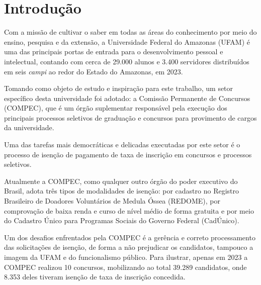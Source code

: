 \documentclass[
	12pt,			%
	openright,		%
	oneside,	
	a4paper,		%
	english,		%
	brazil			%
]{abntex2/abntex2}  %
\begin{document}



	\tableofcontents*
	\cleardoublepage

	\textual

	\chapter{Introdução}
	
		Com a missão de cultivar o saber em todas as áreas do conhecimento por meio do ensino, pesquisa e da extensão, a Universidade Federal do Amazonas (UFAM) é uma das principais portas de entrada para o desenvolvimento pessoal e intelectual, contando com cerca de 29.000 alunos e 3.400 servidores distribuídos em seis \textit{campi} ao redor do Estado do Amazonas, em 2023.
		
		Tomando como objeto de estudo e inspiração para este trabalho, um setor específico desta universidade foi adotado: a Comissão Permanente de Concursos (COMPEC), que é um órgão suplementar responsável pela execução dos principais processos seletivos de graduação e concursos para provimento de cargos da universidade.
		
		Uma das tarefas mais democráticas e delicadas executadas por este setor é o processo de isenção de pagamento de taxa de inscrição em concursos e processos seletivos.
		
		Atualmente a COMPEC, como qualquer outro órgão do poder executivo do Brasil, adota três tipos de modalidades de isenção: por cadastro no Registro Brasileiro de Doadores Voluntários de Medula Óssea (REDOME), por comprovação de baixa renda e curso de nível médio de forma gratuita e por meio do Cadastro Único para Programas Sociais do Governo Federal (CadÚnico).
		
		Um dos desafios enfrentados pela COMPEC é a gerência e correto processamento das solicitações de isenção, de forma a não prejudicar os candidatos, tampouco a imagem da UFAM e do funcionalismo público. Para ilustrar, apenas em 2023 a COMPEC realizou 10 concursos, mobilizando ao total 39.289 candidatos, onde 8.353 deles tiveram isenção de taxa de inscrição concedida.
		
\end{document}
